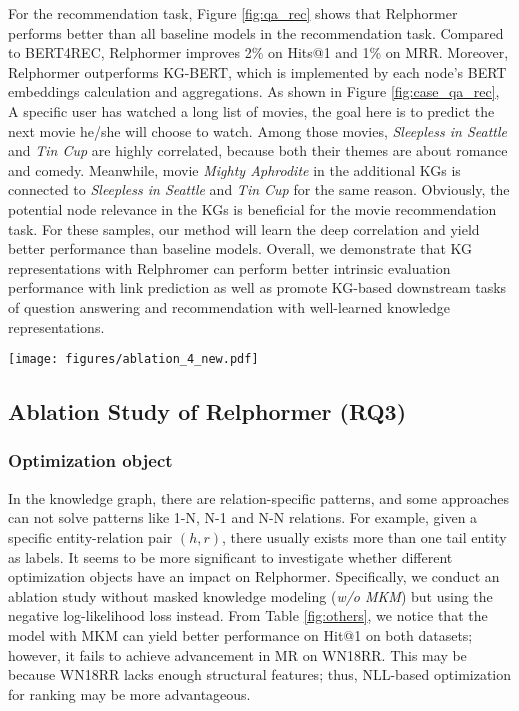\documentclass[sigconf]{acmart}
\begin{document}
For the recommendation task, Figure  \ref{fig:qa_rec}  shows that Relphormer performs better than all baseline models in the recommendation task.
Compared to BERT4REC, Relphormer improves 2\% on Hits@1 and 1\% on MRR.
Moreover, Relphormer outperforms KG-BERT, which is implemented by each node's BERT embeddings calculation and aggregations.
As shown in Figure \ref{fig:case_qa_rec}, 
A specific user has watched a long list of movies, the goal here is to predict the next movie he/she will choose to watch.
Among those movies, \textit{Sleepless in Seattle} and \textit{Tin Cup} are highly correlated, because both their themes are about romance and comedy.
Meanwhile,  movie \textit{Mighty Aphrodite} in the additional KGs is connected to \textit{Sleepless in Seattle} and \textit{Tin Cup} for the same reason.
Obviously, the potential node relevance in the KGs is beneficial for the movie recommendation task. 
For these samples, our method will learn the deep correlation and yield better performance than baseline models.
Overall, we demonstrate that KG representations with Relphromer can perform better intrinsic evaluation performance with link prediction as well as promote KG-based downstream tasks of question answering and recommendation with well-learned knowledge representations.



\begin{figure*}
    \centering

    \texttt{[image: figures/ablation\_4\_new.pdf]}

    \caption{
    Ablation study on WN18RR and FB15K-237.
    Left: results of different model variants on Hits@1.
    Right: results of different model variants on Mean Rank.
    }
    
\label{fig:others}
\end{figure*}


\subsection{Ablation Study of Relphormer (RQ3)}

\subsubsection{\textbf{Optimization object}}
In the knowledge graph, there are relation-specific patterns, and some approaches can not solve patterns like 1-N, N-1 and N-N relations.
For example, given a specific entity-relation pair $(h, r)$, there usually exists more than one tail entity as labels.
It seems to be more significant to investigate whether different optimization objects have an impact on Relphormer.
Specifically, we conduct an ablation study without masked knowledge modeling (\textit{w/o MKM}) but using the negative log-likelihood loss instead.
From Table \ref{fig:others}, we notice that the model with MKM can yield better performance on Hit@1 on both datasets; however, it fails to achieve advancement in MR on WN18RR. 
This may be because WN18RR lacks enough structural features; thus, NLL-based optimization for ranking may be more advantageous.
\end{document}
